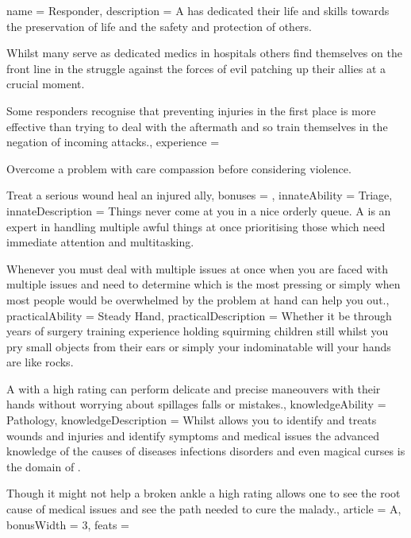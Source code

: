 \archetype
{
	name = Responder,
	description = A \bname{} has dedicated their life and skills towards the preservation of life\comma{} and the safety and protection of others. 

Whilst many serve as dedicated medics in hospitals\comma{} others find themselves on the front line in the struggle against the forces of evil\comma{} patching up their allies at a crucial moment.

Some responders recognise that preventing injuries in the first place is more effective than trying to deal with the aftermath\comma{} and so train themselves in the negation of incoming attacks.,
	experience = \item Overcome a problem with care\comma{} compassion\comma{} before considering violence. 
\item Treat a serious wound\comma{} heal an injured ally,
	bonuses = 
,
	innateAbility = Triage,
	innateDescription = Things never come at you in a nice orderly queue. A \bname{} is an expert in handling multiple awful things at once\comma{} prioritising those which need immediate attention\comma{} and multitasking. 

Whenever you must deal with multiple issues at once\comma{} when you are faced with multiple issues and need to determine which is the most pressing\comma{} or simply when most people would be overwhelmed by the problem at hand\comma{}  can help you out.,
	practicalAbility = Steady Hand,
	practicalDescription = Whether it be through years of surgery training\comma{} experience holding squirming children still whilst you pry small objects from their ears\comma{} or simply your indominatable will\comma{} your hands are like rocks. 

A \bname{} with a high  rating can perform delicate and precise maneouvers with their hands\comma{} without worrying about spillages\comma{} falls or mistakes.,
	knowledgeAbility = Pathology,
	knowledgeDescription = Whilst  allows you to identify and treats wounds and injuries\comma{} and identify symptoms and medical issues\comma{} the advanced knowledge of the causes of diseases\comma{} infections\comma{} disorders and even magical curses is the domain of . 

Though it might not help a broken ankle\comma{} a high  rating allows one to see the root cause of medical issues\comma{} and see the path needed to cure the malady.,
	article = A,
	bonusWidth = 3, feats = \ResponderFeats
}

